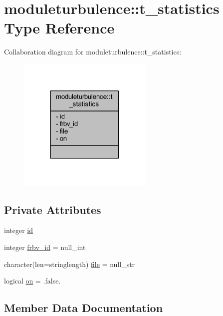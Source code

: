 \hypertarget{structmoduleturbulence_1_1t__statistics}{}\section{moduleturbulence\+:\+:t\+\_\+statistics Type Reference}
\label{structmoduleturbulence_1_1t__statistics}


Collaboration diagram for moduleturbulence\+:\+:t\+\_\+statistics\+:\nopagebreak
\begin{figure}[H]
\begin{center}
\leavevmode
\includegraphics[width=182pt]{structmoduleturbulence_1_1t__statistics__coll__graph}
\end{center}
\end{figure}
\subsection*{Private Attributes}
\begin{DoxyCompactItemize}
\item 
integer \mbox{\hyperlink{structmoduleturbulence_1_1t__statistics_a438b5797e48c062e15a36321ee0bf511}{id}}
\item 
integer \mbox{\hyperlink{structmoduleturbulence_1_1t__statistics_a5dc6011100f496b501f561f54251436c}{frbv\+\_\+id}} = null\+\_\+int
\item 
character(len=stringlength) \mbox{\hyperlink{structmoduleturbulence_1_1t__statistics_a0d4231521cae1e8e45ecd06610fbba64}{file}} = null\+\_\+str
\item 
logical \mbox{\hyperlink{structmoduleturbulence_1_1t__statistics_a8b27dca22b73abd9d788f849d6abdfe0}{on}} = .false.
\end{DoxyCompactItemize}


\subsection{Member Data Documentation}
\mbox{\label{structmoduleturbulence_1_1t__statistics_a0d4231521cae1e8e45ecd06610fbba64}} 

